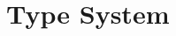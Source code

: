 \documentclass[10pt]{article}
\newcommand{\kw}[1]{\ensuremath{\mathtt{#1}}}
\newcommand{\ebinop}[2]{\ensuremath{{#1}~\oplus~{#2}}}
\newcommand{\ereveal}[3]{\ensuremath{\kw{reveal}\{{#1}\!:\!{#2}\}~{#3}}}
\newcommand{\eshare}[4]{\ensuremath{\kw{share}\{{#1}\!:\!{#2}\rightarrow{#3}\}~{#4}}}
\newcommand{\vshare}[3]{\ensuremath{\{{#3}\}^{#1}_{#2}}}
\begin{document}


\section{Type System}
\label{sec:typing}
\end{document}
